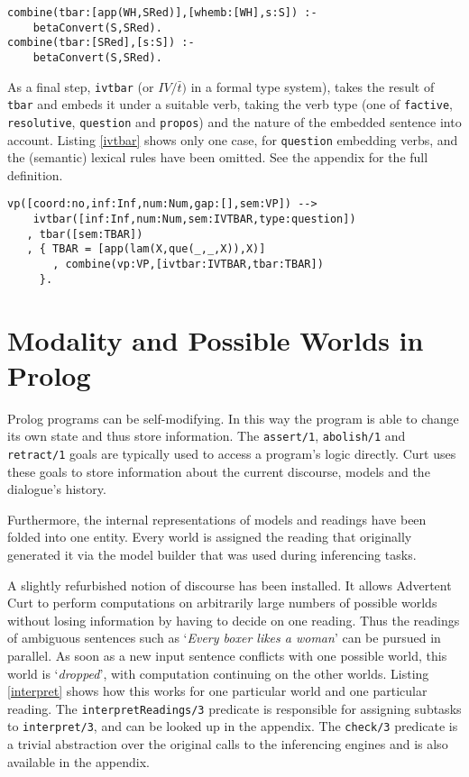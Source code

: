 \documentclass[notitlepage,twoside,a4paper]{scrreprt}
\newcommand{\code}[1]{\texttt{#1}} %
\newcommand{\pn}{\textsf} %
\newcommand{\example}[1]{`\textit{#1}'} %
\newcommand{\curt}{\pn{Curt}}
\newcommand{\acurt}{\pn{Advertent Curt}}
\newcommand{\prol}{\pn{Prolog}}
\theoremstyle{remark}
\theoremstyle{remark}
\theoremstyle{definition}
\theoremstyle{definition}
\begin{document}
\begin{lstlisting}[label=tbarCombine,caption={$\bar{t}$ is responsible for beta-converting the embedded sentence.},float]
combine(tbar:[app(WH,SRed)],[whemb:[WH],s:S]) :-
    betaConvert(S,SRed).
combine(tbar:[SRed],[s:S]) :-
    betaConvert(S,SRed).
\end{lstlisting}

As a final step, \code{ivtbar} (or $IV/\bar{t})$ in a formal type system), takes
the result of \code{tbar} and embeds it under a suitable verb, taking the verb
type (one of \code{factive}, \code{resolutive}, \code{question} and
\code{propos}) and the nature of the embedded sentence into account. Listing
\ref{ivtbar} shows only one case, for \code{question} embedding verbs, and the
(semantic) lexical rules have been omitted. See the
appendix %
for the full definition.

\begin{lstlisting}[label=ivtbar,caption={A question embedding VP requires its antecedent to be a question.},float]
vp([coord:no,inf:Inf,num:Num,gap:[],sem:VP]) -->
    ivtbar([inf:Inf,num:Num,sem:IVTBAR,type:question])
   , tbar([sem:TBAR])
   , { TBAR = [app(lam(X,que(_,_,X)),X)]
       , combine(vp:VP,[ivtbar:IVTBAR,tbar:TBAR])
     }.
\end{lstlisting}

\section{Modality and Possible Worlds in \prol{}} \label{sec:indices}

\prol{} programs can be self-modifying. In this way the program is able to
change its own state and thus store information. The \lstinline!assert/1!,
\lstinline+abolish/1+ and \lstinline!retract/1! goals are typically used to access a
program's logic directly. \curt{} uses these goals to store information about
the current discourse, models and the dialogue's history.

Furthermore, the internal representations of models and readings have been
folded into one entity. Every world is assigned the reading that
originally generated it via the model builder that was used during inferencing
tasks.

A slightly refurbished notion of discourse has been installed. It allows
\acurt{} to perform computations on arbitrarily large numbers of possible worlds
without losing information by having to decide on one reading. Thus the readings
of ambiguous sentences such as \example{Every boxer likes a woman} can be
pursued in parallel.  As soon as a new input sentence conflicts with one
possible world, this world is \example{dropped}, with computation continuing on
the other worlds. Listing \ref{interpret} shows how this works for one
particular world and one particular reading. The \code{interpretReadings/3}
predicate is responsible for assigning subtasks to \code{interpret/3}, and can
be looked up in the appendix. The \code{check/3} predicate is a trivial abstraction
over the original calls to the inferencing engines and is  also available in the
appendix.
\end{document}
